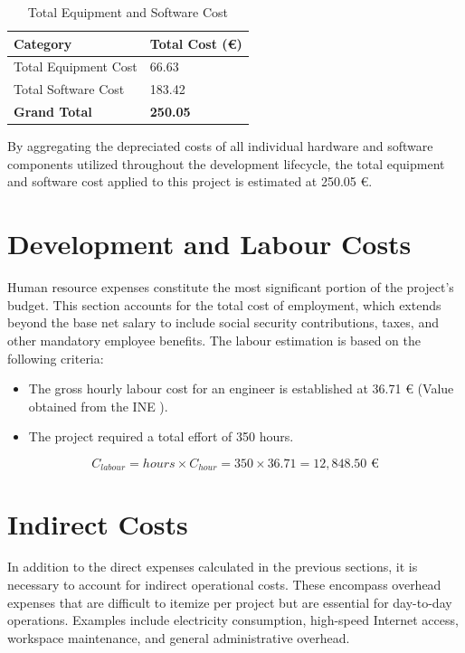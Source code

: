 \begin{table}[H]
    \centering
    \caption{Total Equipment and Software Cost}
    \label{tab:total_equipment_software_cost}
    \begin{tabular}{p{} p{}}
        \toprule
        \textbf{Category} & \textbf{Total Cost (€)} \\
        \midrule
        Total Equipment Cost & 66.63 \\
        Total Software Cost & 183.42 \\
        \midrule
        \textbf{Grand Total} & \textbf{250.05} \\
        \bottomrule
    \end{tabular}
\end{table}

By aggregating the depreciated costs of all individual hardware and software components utilized throughout the development lifecycle, the total equipment and software cost applied to this project is estimated at 250.05 €.

\section{Development and Labour Costs} \label{subsec:budget:labour}

Human resource expenses constitute the most significant portion of the project's budget. This section accounts for the total cost of employment, which extends beyond the base net salary to include social security contributions, taxes, and other mandatory employee benefits. The labour estimation is based on the following criteria:

\begin{itemize}
    \item The gross hourly labour cost for an engineer is established at 36.71 € (Value obtained from the \gls{INE} \cite{CosteLaboralPora}).
    \item The project required a total effort of 350 hours.
\end{itemize}

\vspace{-10pt}

\begin{equation}
    C_{labour} = hours \times C_{hour} = 350 \times 36.71 = 12,848.50\text{ €}
\end{equation}

\section{Indirect Costs} \label{sec:budget:indirect}
In addition to the direct expenses calculated in the previous sections, it is necessary to account for indirect operational costs. These encompass overhead expenses that are difficult to itemize per project but are essential for day-to-day operations. Examples include electricity consumption, high-speed Internet access, workspace maintenance, and general administrative overhead. 

